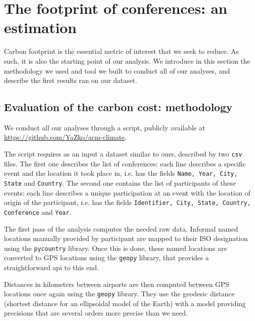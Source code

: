 \section{The footprint of conferences: an estimation}

Carbon footprint is the essential metric of interest that we seek to reduce.
As such, it is also the starting point of our analysis.
We introduce in this section the methodology we used and tool we built to
conduct all of our analyses, and describe the first results ran on our dataset.

\subsection{Evaluation of the carbon cost: methodology}
\label{sec:methodo}


We conduct all our analyses through a \python script, publicly available at
\url{https://github.com/YaZko/acm-climate}.

The script requires as an input a dataset similar to ours, described by two
\texttt{csv} files. The first one describes the list of conferences: each line
describes a specific event and the location it took place in, i.e. has the
fields \texttt{Name, Year, City, State} and \texttt{Country}. The second one
contains the list of participants of these events: each line describes a unique
participation at an event with the location of origin of the participant, i.e.
has the fields \texttt{Identifier, City, State, Country, Conference} and
\texttt{Year}.

The first pass of the analysis computes the needed raw data. 
Informal named locations manually provided by participant are mapped to their
ISO designation using the \texttt{pycountry} library.
Once this is done, these named locations are converted to GPS
locations using the \texttt{geopy} library, that provides a straightforward api
to this end.


Distances in kilometers between airports are then computed between GPS locations
once again using the \texttt{geopy} library. They use the geodesic distance
(shortest distance for an ellipsoidal model of the Earth) with a model providing
precisions that are several orders more precise than we need.


